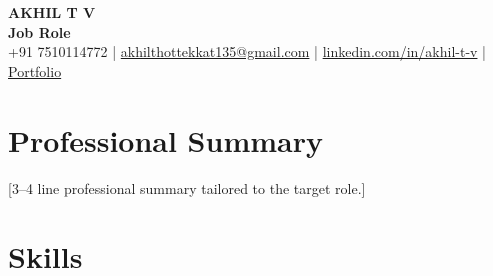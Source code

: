 \documentclass[a4paper,11pt]{article}
\begin{document}

\begin{center}

    {\LARGE \textbf{AKHIL T V}} \\[5pt]

    \textbf{Job Role} \\[5pt]

    \small
    +91 7510114772
    \hspace{0.3cm} | \hspace{0.3cm}
    \href{mailto:akhilthottekkat135@gmail.com}
    {akhilthottekkat135@gmail.com}
    \hspace{0.3cm} | \hspace{0.3cm}
    \href{https://www.linkedin.com/in/akhil-t-v}
    {linkedin.com/in/akhil-t-v}
    \hspace{0.3cm} | \hspace{0.3cm}
    \href{https://yourportfolio.com}
    {Portfolio}

\end{center}

\vspace{-0.2cm}


\section*{Professional Summary}
\vspace{0.04cm}


[3--4 line professional summary tailored to the target role.]


\section*{Skills}
\vspace{0.04cm}
\end{document}
